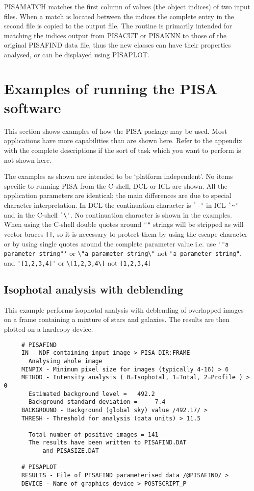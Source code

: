 PISAMATCH matches the first column of values (the object indices) of two
input files. When a match is located between the indices the complete
entry in the second file is copied to the output file. The routine is
primarily intended for matching the indices output from PISACUT or
PISAKNN to those of the original PISAFIND data file, thus the new
classes can have their properties analysed, or can be displayed using
PISAPLOT.

\section{Examples of running the PISA software}

This section shows examples of how the PISA package may be used. Most
applications have more capabilities than are shown here. Refer to the
appendix with the complete descriptions if the sort of task which you
want to perform is not shown here.

The examples as shown are intended to be `platform independent'. No
items specific to running PISA from the C-shell, DCL or ICL are shown.
All the application parameters are identical; the main differences are
due to special character interpretation. In DCL the continuation
character is \verb+`-'+ in ICL \verb+`~'+ and in the C-shell \verb+`\'+.
No continuation character is shown in the examples. When using the
C-shell double quotes around \verb+""+ strings will be stripped as will
vector braces \verb+[]+, so it is necessary to protect them by using the
escape character or by using single quotes around the complete
parameter value i.e. use 
\verb+'"a parameter string"'+ or \verb+\"a parameter string\"+ not
\verb+"a parameter string"+, and
\verb+'[1,2,3,4]'+  or \verb+\[1,2,3,4\]+ not \verb+[1,2,3,4]+

\subsection{Isophotal analysis with deblending}

This example performs isophotal analysis with deblending of overlapped
images on a frame containing a mixture of stars and galaxies.
The results are then plotted on a hardcopy device.
\begin{verbatim}
     # PISAFIND 
     IN - NDF containing input image > PISA_DIR:FRAME 
       Analysing whole image 
     MINPIX - Minimum pixel size for images (typically 4-16) > 6 
     METHOD - Intensity analysis ( 0=Isophotal, 1=Total, 2=Profile ) > 0 
       Estimated background level =   492.2 
       Background standard deviation =     7.4 
     BACKGROUND - Background (global sky) value /492.17/ > 
     THRESH - Threshold for analysis (data units) > 11.5 
  
       Total number of positive images = 141 
       The results have been written to PISAFIND.DAT 
           and PISASIZE.DAT 
  
     # PISAPLOT 
     RESULTS - File of PISAFIND parameterised data /@PISAFIND/ > 
     DEVICE - Name of graphics device > POSTSCRIPT_P
\end{verbatim}


